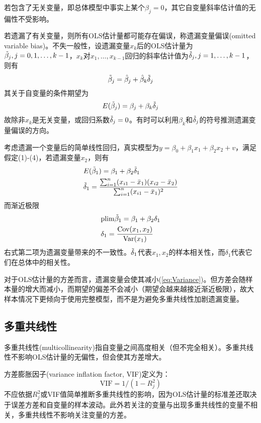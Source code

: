 \par 若包含了无关变量，即总体模型中事实上某个$\beta_j=0$，其它自变量斜率估计值的无偏性不受影响。

\par 若遗漏了有关变量，则所有OLS估计量都可能存在偏误，称遗漏变量偏误(omitted variable bias)。不失一般性，设遗漏变量$x_k$后的OLS估计量为$\Tilde{\beta}_j,j=0,1,\dots,k-1$，$x_k$对$x_1,\dots,x_{k-1}$回归的斜率估计值为$\Tilde{\delta}_j,j=1,\dots,k-1$，则有
\begin{equation}
    \Tilde{\beta}_j=\hat{\beta}_j+\hat{\beta}_k\Tilde{\delta}_j
\end{equation}
其关于自变量的条件期望为
\begin{equation}
    E(\Tilde{\beta}_j)=\beta_j+\beta_k\Tilde{\delta}_j
\end{equation}
故除非$x_k$是无关变量，或回归系数$\Tilde{\delta}_j=0$。有时可以利用$\beta_k$和$\Tilde{\delta}_j$的符号推测遗漏变量偏误的方向。

\par 考虑遗漏一个变量后的简单线性回归，真实模型为$y=\beta_0+\beta_1x_1+\beta_2x_2+v$，满足假定(1)-(4)，若遗漏变量$x_2$，则有
\begin{align}
    &E(\Tilde{\beta}_1)=\beta_1+\beta_2\Tilde{\delta}_1\\ &\Tilde{\delta}_1=\frac{\sum_{i=1}^n (x_{i1}-\bar{x}_1)(x_{i2}-\bar{x}_2)}{\sum_{i=1}^n (x_{i1}-\bar{x}_1)^2}
\end{align}
而渐近极限
\begin{align}
    &\text{plim}\Tilde{\beta}_1=\beta_1+\beta_2\delta_1\\ &\delta_1=\frac{\text{Cov}(x_1,x_2)}{\text{Var}(x_1)}
\end{align}
右式第二项为遗漏变量带来的不一致性。$\Tilde{\delta}_1$代表$x_1,x_2$的样本相关性，而$\delta_1$代表它们在总体中的相关性。

\par 对于OLS估计量的方差而言，遗漏变量会使其减小(\ref{eq:Variance})。但方差会随样本量的增大而减小，而期望的偏差不会减小（期望会越来越接近渐近极限），故大样本情况下更倾向于使用完整模型，而不是为避免多重共线性加剧遗漏变量。

\subsection{多重共线性}

\par 多重共线性(multicollinearity)指自变量之间高度相关（但不完全相关）。多重共线性不影响OLS估计量的无偏性，但会使其方差增大。
\par 方差膨胀因子(variance inflation factor, VIF)定义为：
\begin{equation}
    \text{VIF}=1/(1-R_j^2)
\end{equation}
不应依据$R^2_j$或VIF值简单推断多重共线性的影响，因为OLS估计量的标准差还取决于误差方差和自变量的样本波动。此外若关注的变量与出现多重共线性的变量不相关，多重共线性不影响关注变量的方差。

